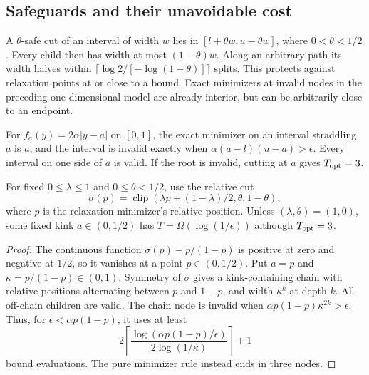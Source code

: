 \subsection{Safeguards and their unavoidable cost}

A $\theta$-safe cut of an interval of width $w$ lies in
$[l+\theta w,u-\theta w]$, where $0<\theta<1/2$.
Every child then has width at most $(1-\theta)w$. Along an arbitrary
path its width halves within
$\lceil\log2/[-\log(1-\theta)]\rceil$ splits.
This protects against relaxation points at or close to a bound.
Exact minimizers at invalid nodes in the preceding one-dimensional model
are already interior, but can be arbitrarily close to an endpoint.

For $f_a(y)=2\alpha|y-a|$ on $[0,1]$, the exact minimizer on an interval
straddling $a$ is $a$, and the interval is invalid exactly when
$\alpha(a-l)(u-a)>\epsilon$. Every interval on one side of $a$ is valid.
If the root is invalid, cutting at $a$ gives $T_{\rm opt}=3$.

\begin{proposition}
\label{branching:persistent-clamp}
For fixed $0\le\lambda\le1$ and $0\le\theta<1/2$, use the relative cut
\[
 \sigma(p)=\operatorname{clip}\left(\lambda p+(1-\lambda)/2,
                                      \theta,1-\theta\right),
\]
where $p$ is the relaxation minimizer's relative position. Unless
$(\lambda,\theta)=(1,0)$, some fixed kink $a\in(0,1/2)$ has
$T=\Omega(\log(1/\epsilon))$ although $T_{\rm opt}=3$.
\end{proposition}

\begin{proof}
The continuous function $\sigma(p)-p/(1-p)$ is positive at zero and
negative at $1/2$, so it vanishes at a point $p\in(0,1/2)$. Put
$a=p$ and $\kappa=p/(1-p)\in(0,1)$. Symmetry of $\sigma$ gives a
kink-containing chain with relative positions alternating between
$p$ and $1-p$, and width $\kappa^k$ at depth $k$. All off-chain
children are valid. The chain node is invalid when
$\alpha p(1-p)\kappa^{2k}>\epsilon$. Thus, for
$\epsilon<\alpha p(1-p)$, it uses at least
\[
 2\left\lceil\frac{\log(\alpha p(1-p)/\epsilon)}
                         {2\log(1/\kappa)}\right\rceil+1
\]
bound evaluations. The pure minimizer rule instead ends in three nodes.
\end{proof}

